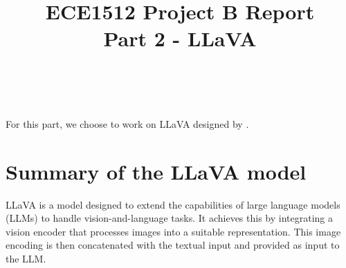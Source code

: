 \documentclass[onecolumn]{IEEEtran}
\begin{document}
\title{ECE1512 Project B Report\\Part 2 - LLaVA}

\author{ \\
}

\maketitle
\thispagestyle{fancy} %




For this part, we choose to work on LLaVA designed by \cite{liu2023visualinstructiontuning}.

\section{Summary of the LLaVA model}
LLaVA is a model designed to extend the capabilities of large language models (LLMs) to handle vision-and-language tasks. It achieves this by integrating a vision encoder that processes images into a suitable representation. This image encoding is then concatenated with the textual input and provided as input to the LLM.
\end{document}
